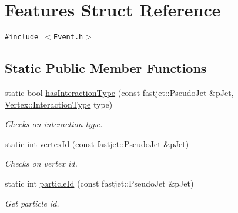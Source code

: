 \hypertarget{structFeatures}{
\section{Features Struct Reference}
\label{structFeatures}
}
{\tt \#include $<$Event.h$>$}

\subsection*{Static Public Member Functions}
\begin{CompactItemize}
\item 
static bool \hyperlink{structFeatures_10d51fec5501f0cd12bcfaf48ce2530b}{has\-Interaction\-Type} (const fastjet::Pseudo\-Jet \&p\-Jet, \hyperlink{classVertex_0d80a5c5ed3bd9be72a325aa448eca25}{Vertex::Interaction\-Type} type)
\begin{CompactList}\small\item\em Checks on interaction type. \item\end{CompactList}\item 
static int \hyperlink{structFeatures_0c8e4fd93e1b6d00c75294f79689294a}{vertex\-Id} (const fastjet::Pseudo\-Jet \&p\-Jet)
\begin{CompactList}\small\item\em Checks on vertex id. \item\end{CompactList}\item 
static int \hyperlink{structFeatures_21401211e5f82aaf43d838be4996f819}{particle\-Id} (const fastjet::Pseudo\-Jet \&p\-Jet)
\begin{CompactList}\small\item\em Get particle id. \item\end{CompactList}\end{CompactItemize}
